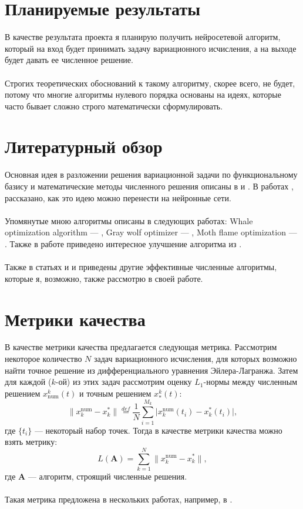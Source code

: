 \documentclass[14pt,a4paper]{article}
\begin{document}
\section{Планируемые результаты}

В качестве результата проекта я планирую получить нейросетевой алгоритм, который на вход будет принимать задачу вариационного исчисления, а на выходе будет давать ее численное решение.\\\\
Строгих теоретических обоснований к такому алгоритму, скорее всего, не будет, потому что многие алгоритмы нулевого порядка основаны на идеях, которые часто бывает сложно строго математически сформулировать.

\section{Литературный обзор}

Основная идея в разложении решения вариационной задачи по функциональному базису и математические методы численного решения описаны в \cite{appliedcalc} и \cite{chebyshev}. В работах \cite{nnarticle}, \cite{dissertation} рассказано, как это идею можно перенести на нейронные сети.\\\\
Упомянутые мною  алгоритмы описаны в следующих работах: Whale optimization algorithm --- \cite{whale}, Gray wolf optimizer --- \cite{graywolf}, Moth flame optimization --- \cite{moth}. Также в работе \cite{whale2} приведено интересное улучшение  алгоритма из \cite{whale}.\\\\
Также в статьях \cite{fastalgorithm} и \cite{splines} и приведены другие эффективные численные алгоритмы, которые я, возможно, также рассмотрю в своей работе.

\section{Метрики качества}

В качестве метрики качества предлагается следующая метрика. Рассмотрим некоторое количество $N$ задач вариационного исчисления, для которых возможно найти точное решение из дифференциального уравнения Эйлера-Лагранжа. Затем для каждой ($k$-ой) из этих задач рассмотрим оценку $L_1$-нормы между численным решением $x^k_{\text{num}}(t)$ и точным решением $x^k_\ast(t)$:
$$\big\lVert x_k^{\text{num}} - x_k^\ast \big\rVert \overset{def}{=} \frac{1}{N} \sum_{i=1}^{M_k} \big\lvert  x_k^{\text{num}}(t_i) - x_k^\ast(t_i) \big\rvert,$$
где $\{t_i\}$ --- некоторый набор точек. Тогда в качестве метрики качества можно взять метрику:
$$L(\mathbf{A}) = \sum_{k=1}^N \big\lVert x_k^{\text{num}} - x_k^\ast \big\rVert,$$
где $\mathbf{A}$ --- алгоритм, строящий численные решения.\\\\
Такая метрика предложена в нескольких работах, например, в \cite{whale}.
\end{document}
